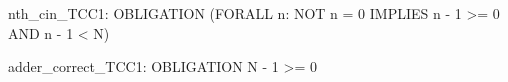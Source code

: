 nth_cin_TCC1: OBLIGATION (FORALL n: NOT n = 0 IMPLIES n - 1 >= 0 AND n - 1 < N)

adder_correct_TCC1: OBLIGATION N - 1 >= 0